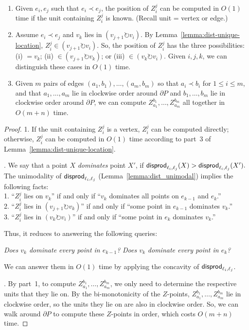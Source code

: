 \documentclass{ws-ijcga}
\begin{document}
\begin{lemma}\label{lemma:Z-compute}~
\begin{enumerate}
\item Given $e_i,e_j$ such that $e_i\prec e_j$,
    the position of $Z_i^j$ can be computed in $O(1)$ time if the unit containing $Z_i^j$ is known. (Recall unit = vertex or edge.)
\item Assume $e_i\prec e_j$ and $v_k$ lies in $(v_{j+1} \circlearrowright v_i)$.
    By Lemma~\ref{lemma:dist-unique-location}, $Z_i^j\in (v_{j+1} \circlearrowright v_i)$.
    So, the position of $Z_i^j$ has the three possibilities:
    (i) $=v_k$; (ii) $\in (v_{j+1} \circlearrowright v_k)$; or (iii) $\in (v_k \circlearrowright v_i)$.
    Given $i,j,k$, we can distinguish these cases in $O(1)$ time.
\item Given $m$ pairs of edges $(a_1,b_1),\ldots,(a_m,b_m)$ so that $a_i\prec b_i$ for $1\leq i\leq m$, and that $a_1,\ldots,a_m$ lie in clockwise order around $\partial P$ and $b_1,\ldots,b_m$ lie in clockwise order around $\partial P$, we can compute $Z_{a_1}^{b_1},\ldots,Z_{a_m}^{b_m}$ all together in $O(m+n)$ time.
\end{enumerate}
\end{lemma}

\begin{proof}
1. If the unit containing $Z_i^j$ is a vertex, $Z_i^j$ can be computed directly;
otherwise, $Z_i^j$ can be computed in $O(1)$ time according to part~3 of Lemma~\ref{lemma:dist-unique-location}.

\smallskip{}. We say that a point $X$ \emph{dominates} point $X'$, if $\mathsf{disprod}_{\ell_i,\ell_j}(X)>\mathsf{disprod}_{\ell_i,\ell_j}(X').$
The unimodality of $\mathsf{disprod}_{\ell_i,\ell_j}$ (Lemma~\ref{lemma:dist_unimodal}) implies the following facts:\\
1. ``$Z_i^j$ lies on $v_k$'' if and only if ``$v_k$ dominates all points on $e_{k-1}$ and $e_k$.''\\
2. ``$Z_i^j$ lies in $(v_{j+1}\circlearrowright v_k)$'' if and only if ``some point in $e_{k-1}$ dominates $v_k$.''\\
3. ``$Z_i^j$ lies in $(v_k \circlearrowright v_i)$'' if and only if ``some point in $e_k$ dominates $v_k$.''

Thus, it reduces to answering the following queries:

\quad \emph{Does $v_k$ dominate every point in $e_{k-1}$?} \emph{Does $v_k$ dominate every point in $e_k$?}

We can answer them in $O(1)$ time by applying the concavity of $\mathsf{disprod}_{\ell_i,\ell_j}$.

\smallskip{}. By part~1, to compute $Z_{a_1}^{b_1},\ldots,Z_{a_m}^{b_m}$, we only need to determine the respective units that they lie on.
By the bi-monotonicity of the $Z$-points, $Z_{a_1}^{b_1},\ldots,Z_{a_m}^{b_m}$ lie in clockwise order,
so the units they lie on are also in clockwise order.
So, we can walk around $\partial P$ to compute these $Z$-points in order, which costs $O(m+n)$ time.
 \end{proof}
\end{document}
